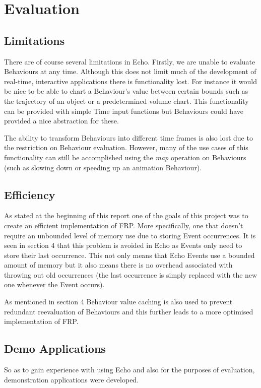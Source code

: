 \chapter{Evaluation}    
  \section{Limitations}
    There are of course several limitations in Echo. Firstly, we are unable to evaluate Behaviours at any time.
    Although this does not limit much of the development of real-time, interactive applications there is functionality
    lost. For instance it would be nice to be able to chart a Behaviour's value between certain bounds such as
    the trajectory of an object or a predetermined volume chart. This functionality can be provided with simple
    Time input functions but Behaviours could have provided a nice abstraction for these.
    
    The ability to transform Behaviours into different time frames is also lost due to the restriction on Behaviour
    evaluation. However, many of the use cases of this functionality can still be accomplished using the
    \emph{map} operation on Behaviours (such as slowing down or speeding up an animation Behaviour).
    
  \section{Efficiency}
    As stated at the beginning of this report one of the goals of this project was to create an efficient implementation
    of FRP. More specifically, one that doesn't require an unbounded level of memory use due to storing Event occurrences.
    It is seen in section 4 that this problem is avoided in Echo as Events only need to store their last
    occurrence. This not only means that Echo Events use a bounded amount of memory but it also means there is
    no overhead associated with throwing out old occurrences (the last occurrence is simply replaced with the new 
    one whenever the Event occurs).
    
    As mentioned in section 4 Behaviour value caching is also used to prevent redundant reevaluation of Behaviours
    and this further leads to a more optimised implementation of FRP.
  
  \section{Demo Applications}
    So as to gain experience with using Echo and also for the purposes of evaluation, demonstration
    applications were developed. 
    
